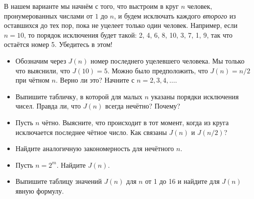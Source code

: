 \documentclass[10pt]{scrbook} \usepackage{modules/nonstahp_book}
\begin{document}
В нашем варианте мы начнём с того, что выстроим в круг $n$ человек, пронумерованных числами от $1$ до $n$, и будем исключать каждого {\itshape второго} из оставшихся до тех пор, пока не уцелеет только один человек. Например, если $n = 10$, то порядок исключения будет такой: 2, 4, 6, 8, 10, 3, 7, 1, 9, так что остаётся номер 5. Убедитесь в этом!
\begin{itemize}
\item Обозначим через $J(n)$ номер последнего уцелевшего человека. Мы только что выяснили, что $J(10) = 5$. Можно было предположить, что $J(n) = n/2$ при чётном $n$. Верно ли это? Начните с $n = 2,3,4,\ldots$.
\item Выпишите табличку, в которой для малых $n$ указаны порядки исключения чисел. Правда ли, что $J(n)$ всегда нечётно? Почему?
\item Пусть $n$ чётно. Выясните, что происходит в тот момент, когда из круга исключается последнее чётное число. Как связаны $J(n)$ и $J(n/2)$?
\item Найдите аналогичную закономерность для нечётного $n$.
\item Пусть $n = 2^m$. Найдите $J(n)$.
\item Выпишите таблицу значений $J(n)$ для $n$ от 1 до 16 и найдите для $J(n)$ явную формулу.
\end{itemize}
\end{document}
